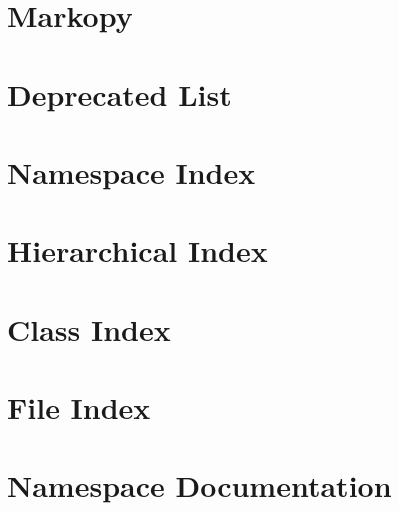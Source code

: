 \let\mypdfximage\pdfximage\def\pdfximage{\immediate\mypdfximage}\documentclass[twoside]{book}
\newcommand{\+}{\discretionary{\mbox{\scriptsize$\hookleftarrow$}}{}{}}
\begin{document}
\chapter{Markopy}
\label{index}\hypertarget{index}{}
\chapter{Deprecated List}
\label{deprecated}

\chapter{Namespace Index}

\chapter{Hierarchical Index}

\chapter{Class Index}

\chapter{File Index}

\chapter{Namespace Documentation}





























\end{document}
